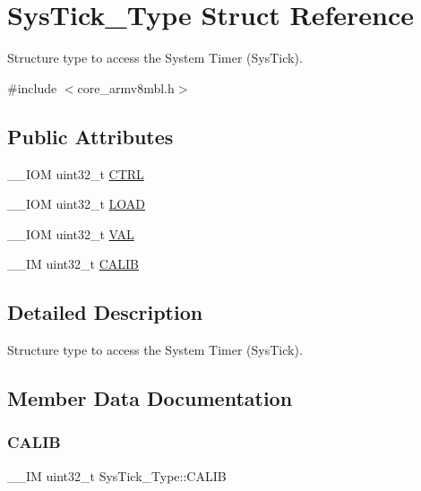 \hypertarget{struct_sys_tick___type}{}\section{Sys\+Tick\+\_\+\+Type Struct Reference}
\label{struct_sys_tick___type}


Structure type to access the System Timer (Sys\+Tick).  




{\ttfamily \#include $<$core\+\_\+armv8mbl.\+h$>$}

\subsection*{Public Attributes}
\begin{DoxyCompactItemize}
\item 
\+\_\+\+\_\+\+I\+OM uint32\+\_\+t \mbox{\hyperlink{struct_sys_tick___type_a875e7afa5c4fd43997fb544a4ac6e37e}{C\+T\+RL}}
\item 
\+\_\+\+\_\+\+I\+OM uint32\+\_\+t \mbox{\hyperlink{struct_sys_tick___type_a4780a489256bb9f54d0ba8ed4de191cd}{L\+O\+AD}}
\item 
\+\_\+\+\_\+\+I\+OM uint32\+\_\+t \mbox{\hyperlink{struct_sys_tick___type_a9b5420d17e8e43104ddd4ae5a610af93}{V\+AL}}
\item 
\+\_\+\+\_\+\+IM uint32\+\_\+t \mbox{\hyperlink{struct_sys_tick___type_afcadb0c6d35b21cdc0018658a13942de}{C\+A\+L\+IB}}
\end{DoxyCompactItemize}


\subsection{Detailed Description}
Structure type to access the System Timer (Sys\+Tick). 

\subsection{Member Data Documentation}
\mbox{\label{struct_sys_tick___type_afcadb0c6d35b21cdc0018658a13942de}} 
\subsubsection{\texorpdfstring{CALIB}{CALIB}}
{\footnotesize\ttfamily \+\_\+\+\_\+\+IM uint32\+\_\+t Sys\+Tick\+\_\+\+Type\+::\+C\+A\+L\+IB}

